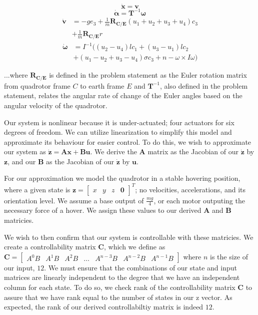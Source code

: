 \documentclass{article}
\begin{document}
\begin{multicols}{2}
\begin{equation}
    \mathbf{\dot{x}} =\mathbf{v}
\end{equation}
\begin{equation}
    \bm{\dot{\alpha}} =\mathbf{T}^{-1}\bm{\omega}
\end{equation}
\begin{align}
    \mathbf{\dot{v}} &=-ge_3+\frac{1}{m}\mathbf{R_{C/E}}(u_1+u_2+u_3+u_4)c_3 \nonumber\\ &+\frac{1}{m}\mathbf{R_{C/E}}r
\end{align}
\begin{align}
    \bm{\dot{\omega}} &=I^{-1}((u_2-u_4)lc_1+(u_3-u_1)lc_2 \nonumber\\ &+(u_1-u_2+u_3-u_4)\sigma c_3+n-\omega \times I \omega)
\end{align}

\noindent ...where $\mathbf{R_{C/E}}$ is defined in the problem statement as the Euler rotation matrix from quadrotor frame $C$ to earth frame $E$ and $\mathbf{T}^{-1}$, also defined in the problem statement, relates the angular rate of change of the Euler angles based on the angular velocity of the quadrotor.

Our system is nonlinear because it is under-actuated; four actuators for six degrees of freedom. We can utilize linearization to simplify this model and approximate its behaviour for easier control. To do this, we wish to approximate our system as $\boldsymbol{\dot{z}}=\boldsymbol{A}\boldsymbol{x}+\boldsymbol{B}\boldsymbol{u}$. We derive the $\boldsymbol{A}$ matrix as the Jacobian of our $\boldsymbol{\dot{z}}$ by $\boldsymbol{z}$, and our $\boldsymbol{B}$ as the Jacobian of our $\boldsymbol{\dot{z}}$ by $\boldsymbol{u}$. 

For our approximation we model the quadrotor in a stable hovering position, where a given state is $\boldsymbol{z}=\begin{bmatrix} 
x & y & z & \boldsymbol{0}\end{bmatrix}^T$; no velocities, accelerations, and its orientation level. We assume a base output of $
\frac{mg}{4}$, or each motor outputing the necessary force of a hover. We assign these values to our derived $\boldsymbol{A}$ and 
$\boldsymbol{B}$ matricies.

We wish to then confirm that our system is controllable with these matricies. We create a controllability matrix $\boldsymbol{C}$, 
which we define as $\boldsymbol{C} = \begin{bmatrix} A^0B & A^1B & A^2B & \dots & A^{n-3}B & A^{n-2}B & A^{n-1}B\end{bmatrix}$ 
where $n$ is the size of our input, $12$. We must ensure that the combinations of our state and input matrices are linearly 
independent to the degree that we have an independent column for each state. To do so, we check rank of the controllability matrix $
\boldsymbol{C}$ to assure that we have rank equal to the number of states in our z vector. As expected, the rank of our derived 
controllabiltiy matrix is indeed $12$.


\end{multicols}
\end{document}
